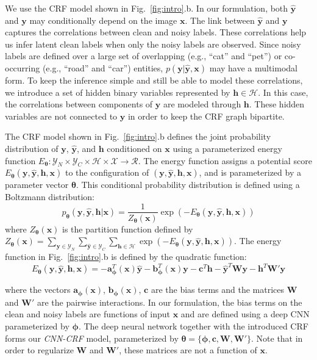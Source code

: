 \documentclass{article}
\newcommand{\x}{{\pmb{x}}}
\newcommand{\y}{{\pmb{y}}}
\newcommand{\yh}{{\hat{\pmb{y}}}}
\newcommand{\h}{{\pmb{h}}}
\renewcommand{\a}{{\pmb{a}}}
\renewcommand{\b}{{\pmb{b}}}
\renewcommand{\c}{{\pmb{c}}}
\newcommand{\W}{{\pmb{W}}}
\newcommand{\Wp}{{\pmb{W'}}}
\newcommand{\btheta}{{\pmb{\theta}}}
\newcommand{\bphi}{{\pmb{\phi}}}
\begin{document}
We use the CRF model shown in Fig.~\ref{fig:intro}.b. 
In our formulation, both $\yh$ and $\y$ may conditionally depend on the image $\x$. The link between $\yh$ and $\y$ captures the correlations between clean and noisy labels.
These correlations help us infer latent clean labels when only the noisy labels are observed. Since noisy labels are defined over 
a large set of overlapping (e.g., ``cat'' and ``pet'') or co-occurring (e.g., ``road'' and ``car'') entities, $p(\y | \yh, \x)$ may have a multimodal form.
To keep the inference simple and still be able to model these correlations, we introduce a set of hidden binary variables represented by $\h \in \mathcal{H}$.
In this case, the correlations between components of $\y$ are modeled through $\h$. These hidden variables are not connected to $\yh$ in order to keep the CRF graph bipartite.

The CRF model shown in Fig.~\ref{fig:intro}.b defines the joint probability distribution of $\y$, $\yh$, and $\h$ conditioned on $\x$ using a parameterized energy function 
$E_\btheta: \mathcal{Y}_N \times \mathcal{Y}_C \times \mathcal{H} \times \mathcal{X} \rightarrow \mathcal{R}$. The energy function assigns a potential score $E_\btheta(\y, \yh, \h, \x)$ to the configuration
of $(\y, \yh, \h, \x)$, and is parameterized by a parameter vector $\btheta$. This conditional probability distribution is defined using a Boltzmann distribution:
\begin{equation} \label{eq:crf_prob}
p_{\btheta}(\y, \yh, \h | \x) = \frac{1}{Z_{\btheta}(\x)} \exp(-E_\btheta(\y, \yh, \h, \x))
\end{equation}
where $Z_{\btheta}(\x)$ is the partition function defined by 
{\small$ \displaystyle Z_{\btheta}(\x) = \sum_{\y \in \mathcal{Y}_N} \sum_{\yh \in \mathcal{Y}_C} \sum_{\h \in \mathcal{H}} \exp(-E_\btheta(\y, \yh, \h, \x))$}.
The energy function in Fig.~\ref{fig:intro}.b is defined by the quadratic function:
\begin{equation} \label{eq:crf_energy}
E_\btheta(\y, \yh, \h, \x) = - \a^T_\bphi(\x) \yh - \b^T_\bphi(\x) \y  - \c^T \h - \yh^T \W \y - \h^T \Wp \y
\end{equation}

where the vectors $\a_\bphi(\x)$, $\b_\bphi(\x)$, $\c$ are the bias terms and the matrices $\W$ and $\Wp$ are the pairwise interactions. In our formulation,
the bias terms on the clean and noisy labels are functions of input $\x$ and are defined using a deep CNN parameterized by $\bphi$.
The deep neural network together with the introduced CRF forms our \textit{CNN-CRF} model, parameterized by $\btheta = \{\bphi, \c, \W, \Wp \}$. Note that in order to 
regularize $\W$ and $\Wp$, these matrices
are not a function of $\x$.
\end{document}
